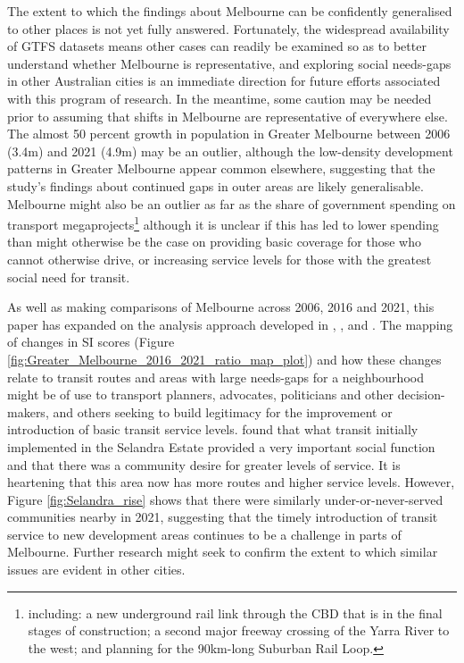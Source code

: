 \documentclass[preprint, 3p,
authoryear]{elsarticle} %
\begin{document}
The extent to which the findings about Melbourne can be confidently
generalised to other places is not yet fully answered. Fortunately, the
widespread availability of GTFS datasets means other cases can readily
be examined so as to better understand whether Melbourne is
representative, and exploring social needs-gaps in other Australian
cities is an immediate direction for future efforts associated with this
program of research. In the meantime, some caution may be needed prior
to assuming that shifts in Melbourne are representative of everywhere
else. The almost 50 percent growth in population in Greater Melbourne
between 2006 (3.4m) and 2021 (4.9m) may be an outlier, although the
low-density development patterns in Greater Melbourne appear common
elsewhere, suggesting that the study's findings about continued gaps in
outer areas are likely generalisable. Melbourne might also be an outlier
as far as the share of government spending on transport
megaprojects\footnote{including: a new underground rail link through the
  CBD that is in the final stages of construction; a second major
  freeway crossing of the Yarra River to the west; and planning for the
  90km-long Suburban Rail Loop.} although it is unclear if this has led
to lower spending than might otherwise be the case on providing basic
coverage for those who cannot otherwise drive, or increasing service
levels for those with the greatest social need for transit.

As well as making comparisons of Melbourne across 2006, 2016 and 2021,
this paper has expanded on the analysis approach developed in
\citet{Currie2003Hobart}, \citet{Currie2004Gap},
\citet{Currie2007Identifying} and \citet{currie2010identifying}. The
mapping of changes in SI scores (Figure
\ref{fig:Greater_Melbourne_2016_2021_ratio_map_plot}) and how these
changes relate to transit routes and areas with large needs-gaps for a
neighbourhood might be of use to transport planners, advocates,
politicians and other decision-makers, and others seeking to build
legitimacy for the improvement or introduction of basic transit service
levels. \citet{delbosc2015impact} found that what transit initially
implemented in the Selandra Estate provided a very important social
function and that there was a community desire for greater levels of
service. It is heartening that this area now has more routes and higher
service levels. However, Figure \ref{fig:Selandra_rise} shows that there
were similarly under-or-never-served communities nearby in 2021,
suggesting that the timely introduction of transit service to new
development areas continues to be a challenge in parts of Melbourne.
Further research might seek to confirm the extent to which similar
issues are evident in other cities.
\end{document}
